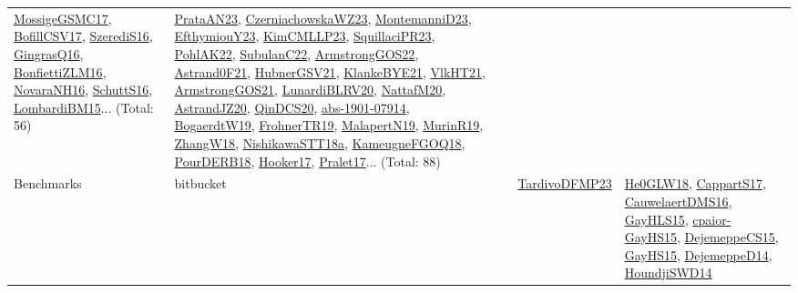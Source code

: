 {\begin{longtable}{lp{3cm}>{\raggedright}p{6cm}>{\raggedright}p{6cm}p{8cm}}
\href{papers/MossigeGSMC17.pdf}{MossigeGSMC17}\cite{MossigeGSMC17}, \href{papers/BofillCSV17.pdf}{BofillCSV17}\cite{BofillCSV17}, \href{papers/SzerediS16.pdf}{SzerediS16}\cite{SzerediS16}, \href{papers/GingrasQ16.pdf}{GingrasQ16}\cite{GingrasQ16}, \href{papers/BonfiettiZLM16.pdf}{BonfiettiZLM16}\cite{BonfiettiZLM16}, \href{articles/NovaraNH16.pdf}{NovaraNH16}\cite{NovaraNH16}, \href{papers/SchuttS16.pdf}{SchuttS16}\cite{SchuttS16}, \href{papers/LombardiBM15.pdf}{LombardiBM15}\cite{LombardiBM15}... (Total: 56) & \href{articles/PrataAN23.pdf}{PrataAN23}\cite{PrataAN23}, \href{articles/CzerniachowskaWZ23.pdf}{CzerniachowskaWZ23}\cite{CzerniachowskaWZ23}, \href{articles/MontemanniD23.pdf}{MontemanniD23}\cite{MontemanniD23}, \href{papers/EfthymiouY23.pdf}{EfthymiouY23}\cite{EfthymiouY23}, \href{papers/KimCMLLP23.pdf}{KimCMLLP23}\cite{KimCMLLP23}, \href{papers/SquillaciPR23.pdf}{SquillaciPR23}\cite{SquillaciPR23}, \href{articles/PohlAK22.pdf}{PohlAK22}\cite{PohlAK22}, \href{articles/SubulanC22.pdf}{SubulanC22}\cite{SubulanC22}, \href{papers/ArmstrongGOS22.pdf}{ArmstrongGOS22}\cite{ArmstrongGOS22}, \href{papers/Astrand0F21.pdf}{Astrand0F21}\cite{Astrand0F21}, \href{articles/HubnerGSV21.pdf}{HubnerGSV21}\cite{HubnerGSV21}, \href{papers/KlankeBYE21.pdf}{KlankeBYE21}\cite{KlankeBYE21}, \href{articles/VlkHT21.pdf}{VlkHT21}\cite{VlkHT21}, \href{papers/ArmstrongGOS21.pdf}{ArmstrongGOS21}\cite{ArmstrongGOS21}, \href{articles/LunardiBLRV20.pdf}{LunardiBLRV20}\cite{LunardiBLRV20}, \href{papers/NattafM20.pdf}{NattafM20}\cite{NattafM20}, \href{articles/AstrandJZ20.pdf}{AstrandJZ20}\cite{AstrandJZ20}, \href{articles/QinDCS20.pdf}{QinDCS20}\cite{QinDCS20}, \href{articles/abs-1901-07914.pdf}{abs-1901-07914}\cite{abs-1901-07914}, \href{papers/BogaerdtW19.pdf}{BogaerdtW19}\cite{BogaerdtW19}, \href{papers/FrohnerTR19.pdf}{FrohnerTR19}\cite{FrohnerTR19}, \href{papers/MalapertN19.pdf}{MalapertN19}\cite{MalapertN19}, \href{papers/MurinR19.pdf}{MurinR19}\cite{MurinR19}, \href{articles/ZhangW18.pdf}{ZhangW18}\cite{ZhangW18}, \href{papers/NishikawaSTT18a.pdf}{NishikawaSTT18a}\cite{NishikawaSTT18a}, \href{papers/KameugneFGOQ18.pdf}{KameugneFGOQ18}\cite{KameugneFGOQ18}, \href{articles/PourDERB18.pdf}{PourDERB18}\cite{PourDERB18}, \href{papers/Hooker17.pdf}{Hooker17}\cite{Hooker17}, \href{papers/Pralet17.pdf}{Pralet17}\cite{Pralet17}... (Total: 88)\\
Benchmarks & bitbucket &  & \href{papers/TardivoDFMP23.pdf}{TardivoDFMP23}\cite{TardivoDFMP23} & \href{papers/He0GLW18.pdf}{He0GLW18}\cite{He0GLW18}, \href{papers/CappartS17.pdf}{CappartS17}\cite{CappartS17}, \href{papers/CauwelaertDMS16.pdf}{CauwelaertDMS16}\cite{CauwelaertDMS16}, \href{papers/GayHLS15.pdf}{GayHLS15}\cite{GayHLS15}, \href{papers/cpaior-GayHS15.pdf}{cpaior-GayHS15}\cite{cpaior-GayHS15}, \href{papers/DejemeppeCS15.pdf}{DejemeppeCS15}\cite{DejemeppeCS15}, \href{papers/GayHS15.pdf}{GayHS15}\cite{GayHS15}, \href{papers/DejemeppeD14.pdf}{DejemeppeD14}\cite{DejemeppeD14}, \href{papers/HoundjiSWD14.pdf}{HoundjiSWD14}\cite{HoundjiSWD14}\\

\end{longtable}}
